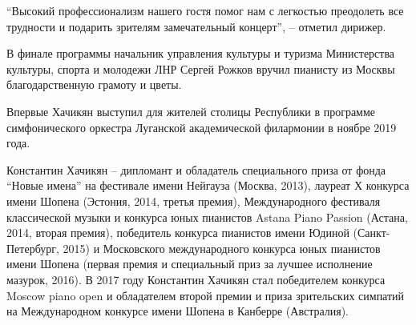 \enquote{Высокий профессионализм нашего гостя помог нам с легкостью преодолеть все
трудности и подарить зрителям замечательный концерт}, – отметил дирижер.

В финале программы начальник управления культуры и туризма Министерства
культуры, спорта и молодежи ЛНР Сергей Рожков вручил пианисту из Москвы
благодарственную грамоту и цветы.

Впервые Хачикян выступил для жителей столицы Республики в программе
симфонического оркестра Луганской академической филармонии в ноябре 2019 года.

Константин Хачикян – дипломант и обладатель специального приза от фонда \enquote{Новые
имена} на фестивале имени Нейгауза (Москва, 2013), лауреат Х конкурса имени
Шопена (Эстония, 2014, третья премия), Международного фестиваля классической
музыки и конкурса юных пианистов Astana Piano Passion (Астана, 2014, вторая
премия), победитель конкурса пианистов имени Юдиной (Санкт-Петербург, 2015) и
Московского международного конкурса юных пианистов имени Шопена (первая премия
и специальный приз за лучшее исполнение мазурок, 2016). В 2017 году Константин
Хачикян стал победителем конкурса Moscow piano open и обладателем второй премии
и приза зрительских симпатий на Международном конкурсе имени Шопена в Канберре
(Австралия).
